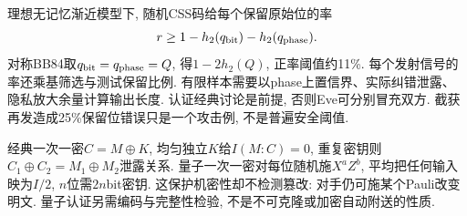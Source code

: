 理想无记忆渐近模型下, 随机CSS码给每个保留原始位的率
\[r\ge1-h_2(q_{\rm bit})-h_2(q_{\rm phase}).\]
对称BB84取$q_{\rm bit}=q_{\rm phase}=Q$, 得$1-2h_2(Q)$, 正率阈值约11\%. 每个发射信号的率还乘基筛选与测试保留比例. 有限样本需要以phase上置信界、实际纠错泄露、隐私放大余量计算输出长度. 认证经典讨论是前提, 否则Eve可分别冒充双方. 截获再发造成25\%保留位错误只是一个攻击例, 不是普遍安全阈值.

经典一次一密$C=M\oplus K$, 均匀独立$K$给$I(M:C)=0$, 重复密钥则$C_1\oplus C_2=M_1\oplus M_2$泄露关系. 量子一次一密对每位随机施$X^aZ^b$, 平均把任何输入映为$I/2$, $n$位需$2n$bit密钥. 这保护机密性却不检测篡改: 对手仍可施某个Pauli改变明文. 量子认证另需编码与完整性检验, 不是不可克隆或加密自动附送的性质.
